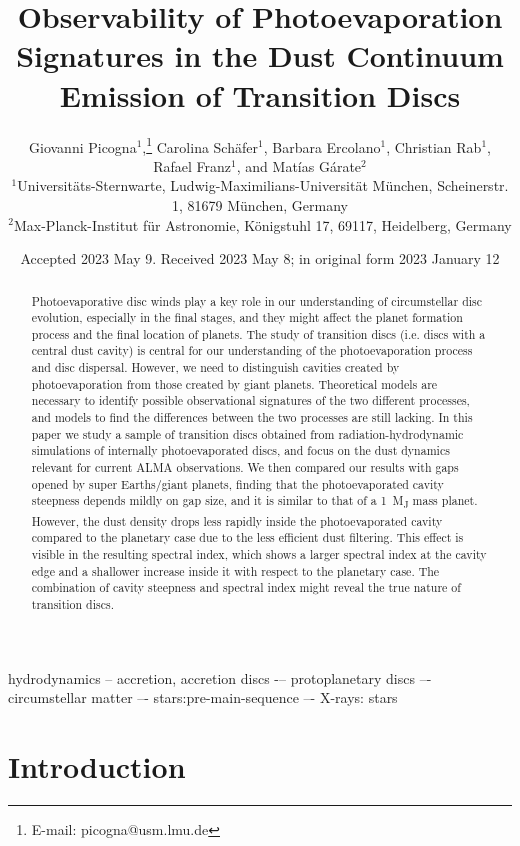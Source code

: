 \documentclass[fleqn,usenatbib]{mnras}
\title[Observability of Transition Discs]{Observability of Photoevaporation Signatures in the Dust Continuum Emission of Transition Discs}
\author[Picogna et al. 2023]{
Giovanni Picogna$^{1}$,\thanks{E-mail: picogna@usm.lmu.de}
Carolina Sch{{\"a}}fer$^{1}$,
Barbara Ercolano$^{1}$,
Christian Rab$^{1}$,
Rafael Franz$^{1}$,
and Mat\'ias G\'arate$^{2}$
\\
$^{1}$Universit\"ats-Sternwarte, Ludwig-Maximilians-Universit\"at M\"unchen, Scheinerstr. 1, 81679 M\"unchen, Germany\\
$^{2}$Max-Planck-Institut f\"ur Astronomie, K\"onigstuhl 17, 69117, Heidelberg, Germany
}
\date{Accepted 2023 May 9. Received 2023 May 8; in original form 2023 January 12}
\begin{document}
\label{firstpage}
\pagerange{\pageref{firstpage}--\pageref{lastpage}}
\maketitle

\begin{abstract}
Photoevaporative disc winds play a key role in our understanding of circumstellar disc evolution, especially in the final stages, and they might affect the planet formation process and the final location of planets. The study of transition discs (i.e. discs with a central dust cavity) is central for our understanding of the photoevaporation process and disc dispersal. However, we need to distinguish cavities created by photoevaporation from those created by giant planets. Theoretical models are necessary to identify possible observational signatures of the two different processes, and models to find the differences between the two processes are still lacking. In this paper we study a sample of transition discs obtained from radiation-hydrodynamic simulations of internally photoevaporated discs, and focus on the dust dynamics relevant for current ALMA observations. We then compared our results with gaps opened by super Earths/giant planets, finding that the photoevaporated cavity steepness depends mildly on gap size, and it is similar to that of a \SI{1}{M_J} mass planet. However, the dust density drops less rapidly inside the photoevaporated cavity compared to the planetary case due to the less efficient dust filtering. This effect is visible in the resulting spectral index, which shows a larger spectral index at the cavity edge and a shallower increase inside it with respect to the planetary case. The combination of cavity steepness and spectral index might reveal the true nature of transition discs.
\end{abstract}

\begin{keywords}
hydrodynamics -- accretion,  accretion discs -– protoplanetary discs –- circumstellar matter –- stars:pre-main-sequence –- X-rays: stars 
\end{keywords}



\section{Introduction}
\end{document}
